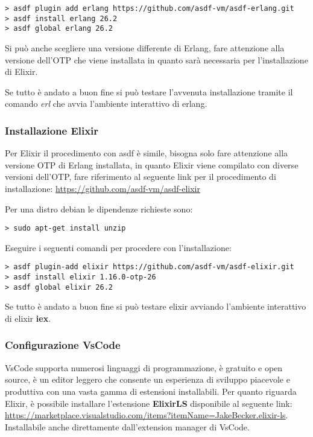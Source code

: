 \begin{lstlisting}[language=none]
> asdf plugin add erlang https://github.com/asdf-vm/asdf-erlang.git
> asdf install erlang 26.2
> asdf global erlang 26.2 
\end{lstlisting}

Si può anche scegliere una versione differente di Erlang, fare attenzione
alla versione dell'OTP che viene installata in quanto sarà
necessaria per l'installazione di Elixir.

Se tutto è andato a buon fine si può testare l'avvenuta installazione
tramite il comando \textit{erl} che avvia l'ambiente interattivo di erlang.

\subsubsection{Installazione Elixir}

Per Elixir il procedimento con asdf è simile, bisogna solo fare
attenzione alla versione OTP di Erlang installata, in quanto
Elixir viene compilato con diverse versioni dell'OTP,
fare riferimento al seguente link per il procedimento di installazione:
\url{https://github.com/asdf-vm/asdf-elixir}

Per una distro debian le dipendenze richieste sono:
\begin{lstlisting}[language=none]
> sudo apt-get install unzip
\end{lstlisting}

Eseguire i seguenti comandi per procedere con l'installazione:
\begin{lstlisting}[language=none]
> asdf plugin-add elixir https://github.com/asdf-vm/asdf-elixir.git
> asdf install elixir 1.16.0-otp-26
> asdf global elixir 26.2 
\end{lstlisting}

Se tutto è andato a buon fine si può testare elixir avviando l'ambiente
interattivo di elixir \textbf{iex}.


\subsubsection{Configurazione VsCode}

VsCode supporta numerosi linguaggi di programmazione, è gratuito e
open source, è un editor leggero che consente un esperienza di sviluppo
piacevole e produttiva con una vasta gamma di estensioni installabili.
Per quanto riguarda Elixir, è possibile installare l'estensione
\textbf{ElixirLS} disponibile al seguente link:
\url{https://marketplace.visualstudio.com/items?itemName=JakeBecker.elixir-ls}.
Installabile anche direttamente dall'extension manager di VsCode.
 